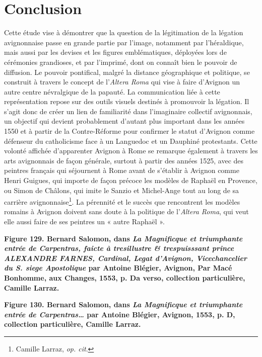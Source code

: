 \documentclass[12pt,twoside,openany]{book}
\begin{document}
\section{Conclusion}

Cette étude vise à démontrer que la question de la légitimation de la légation avignonnaise passe en grande partie par l’image, notamment par l’héraldique, mais aussi par les devises et les figures emblématiques, déployées lors de cérémonies grandioses, et par l’imprimé, dont on connaît bien le pouvoir de diffusion. Le pouvoir pontifical, malgré la distance géographique et politique, se construit à travers le concept de l’\textit{Altera Roma} qui vise à faire d’Avignon un autre centre névralgique de la papauté. La communication liée à cette représentation repose sur des outils visuels destinés à promouvoir la légation. Il s’agit donc de créer un lien de familiarité dans l’imaginaire collectif avignonnais, un objectif qui devient probablement d’autant plus important dans les années 1550 et à partir de la Contre-Réforme pour confirmer le statut d’Avignon comme défenseur du catholicisme face à un Languedoc et un Dauphiné protestants. Cette volonté affichée d’apparenter Avignon à Rome se remarque également à travers les arts avignonnais de façon générale, surtout à partir des années 1525, avec des peintres français qui séjournent à Rome avant de s’établir à Avignon comme Henri Guigues, qui importe de façon précoce les modèles de Raphaël en Provence, ou Simon de Châlons, qui imite le Sanzio et Michel-Ange tout au long de sa carrière avignonnaise\footnote{Camille Larraz, \textit{op. cit}.}. La pérennité et le succès que rencontrent les modèles romains à Avignon doivent sans doute à la politique de l’\textit{Altera Roma}, qui veut elle aussi faire de ses peintres un « autre Raphaël ».

\begin{center}
\par\small \textbf{Figure 129. Bernard Salomon, dans \textit{La Magnificque et triumphante entrée de Carpentras, faicte à tresillustre \& trespuisssant prince ALEXANDRE FARNES, Cardinal, Legat d’Avignon, Vicechancelier du S. siege Apostolique} par Antoine Blégier, Avignon, Par Macé Bonhomme, aux Changes, 1553, p. Da verso, collection particulière, Camille Larraz.}
\end{center}

\begin{center}
\par\small \textbf{Figure 130. Bernard Salomon, dans \textit{La Magnificque et triumphante entrée de Carpentras… }par Antoine Blégier, Avignon, 1553, p. D, collection particulière, Camille Larraz.}
\end{center}
\end{document}
